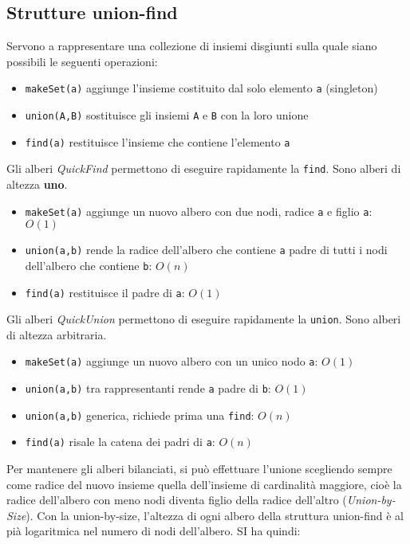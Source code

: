\documentclass[12pt]{article}
\begin{document}
\subsection{Strutture union-find}
Servono a rappresentare una collezione di insiemi disgiunti sulla quale siano possibili le seguenti operazioni:
\begin{itemize}
    \item \texttt{makeSet(a)} aggiunge l'insieme costituito dal solo elemento \texttt{a} (singleton)
    \item \texttt{union(A,B)} sostituisce gli insiemi \texttt{A} e \texttt{B} con la loro unione
    \item \texttt{find(a)} restituisce l'insieme che contiene l'elemento \texttt{a}
\end{itemize}
Gli alberi \textit{QuickFind} permettono di eseguire rapidamente la \texttt{find}. Sono alberi di altezza \textbf{uno}.
\begin{itemize}
    \item \texttt{makeSet(a)} aggiunge un nuovo albero con due nodi, radice \texttt{a} e figlio \texttt{a}: $O(1)$
    \item \texttt{union(a,b)} rende la radice dell'albero che contiene \texttt{a} padre di tutti i nodi dell'albero che contiene \texttt{b}: $O(n)$ 
    \item \texttt{find(a)} restituisce il padre di \texttt{a}: $O(1)$
\end{itemize}
Gli alberi \textit{QuickUnion} permettono di eseguire rapidamente la \texttt{union}. Sono alberi di altezza arbitraria.
\begin{itemize}
    \item \texttt{makeSet(a)} aggiunge un nuovo albero con un unico nodo \texttt{a}: $O(1)$
    \item \texttt{union(a,b)} tra rappresentanti rende \texttt{a} padre di \texttt{b}: $O(1)$
    \item \texttt{union(a,b)} generica, richiede prima una \texttt{find}: $O(n)$
    \item \texttt{find(a)} risale la catena dei padri di \texttt{a}: $O(n)$
\end{itemize}
Per mantenere gli alberi bilanciati, si può effettuare l'unione scegliendo sempre come radice del nuovo insieme quella dell'insieme di cardinalità maggiore, cioè la radice dell'albero con meno nodi diventa figlio della radice dell'altro (\textit{Union-by-Size}). Con la union-by-size, l'altezza di ogni albero della struttura union-find è al pià logaritmica nel numero di nodi dell'albero. SI ha quindi:
\end{document}
